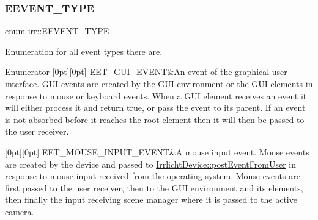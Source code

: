 \subsubsection{\texorpdfstring{E\+E\+V\+E\+N\+T\+\_\+\+T\+Y\+PE}{EEVENT\_TYPE}\hspace{0.1cm}{\footnotesize\ttfamily [1/2]}}
{\footnotesize\ttfamily enum \hyperlink{namespaceirr_ac9eed96e06e85ce3c86fcbbbe9e48a0c}{irr\+::\+E\+E\+V\+E\+N\+T\+\_\+\+T\+Y\+PE}}



Enumeration for all event types there are. 

\begin{DoxyEnumFields}{Enumerator}
[0pt][0pt]{}\mbox{\label{namespaceirr_ac9eed96e06e85ce3c86fcbbbe9e48a0ca722f7807c115f23756853584a3f6d5f6}} 
E\+E\+T\+\_\+\+G\+U\+I\+\_\+\+E\+V\+E\+NT&An event of the graphical user interface. G\+UI events are created by the G\+UI environment or the G\+UI elements in response to mouse or keyboard events. When a G\+UI element receives an event it will either process it and return true, or pass the event to its parent. If an event is not absorbed before it reaches the root element then it will then be passed to the user receiver. \\
\hline

[0pt][0pt]{}\mbox{\label{namespaceirr_ac9eed96e06e85ce3c86fcbbbe9e48a0ca5467579b5240c886d12f33854e74a93d}} 
E\+E\+T\+\_\+\+M\+O\+U\+S\+E\+\_\+\+I\+N\+P\+U\+T\+\_\+\+E\+V\+E\+NT&A mouse input event. Mouse events are created by the device and passed to \hyperlink{classirr_1_1IrrlichtDevice_abf859e39f017b0403c6ed331e48e01df}{Irrlicht\+Device\+::post\+Event\+From\+User} in response to mouse input received from the operating system. Mouse events are first passed to the user receiver, then to the G\+UI environment and its elements, then finally the input receiving scene manager where it is passed to the active camera. \\
\hline


\end{DoxyEnumFields}
